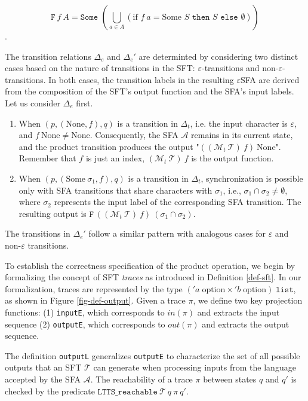 \[\texttt{F}~f~A=\texttt{Some } (\bigcup_{a\in A} (\text{if }f~a= \text{Some }S \texttt{ then } S \texttt{ else } \emptyset))\].

The transition relations $\Delta_e$ and $\Delta_e'$ are determinted by considering two distinct cases based on the nature of transitions in the SFT: $\varepsilon$-transitions and non-$\varepsilon$-transitions. In both cases, the transition labels in the resulting $\varepsilon$SFA are derived from the composition of the SFT's output function and the SFA's input labels. Let us consider $\Delta_e$ first.

\begin{enumerate}
\item When $(p, (\text{None}, f), q)$ is a transition in $\Delta_t$, i.e. the input character is $\varepsilon$, and $f~\text{None} \neq \text{None}$. Consequently, the SFA $\mathcal{A}$ remains in its current state, and the product transition produces the output "$((\mathcal{M}_t~\mathcal{T})~f)~\text{None}$". Remember that $f$ is just an index, $(\mathcal{M}_t~\mathcal{T})~f$ is the output function.

\item When $(p, (\text{Some}~\sigma_1, f), q)$ is a transition in $\Delta_t$, synchronization is possible only with SFA transitions that share characters with $\sigma_1$, i.e., $\sigma_1\cap\sigma_2\neq \emptyset$, where $\sigma_2$ represents the input label of the corresponding SFA transition. The resulting output is $\texttt{F}~((\mathcal{M}_t~\mathcal{T})~f)~(\sigma_1\cap\sigma_2)$.
\end{enumerate}

The transitions in $\Delta_e'$ follow a similar pattern with analogous cases for $\varepsilon$ and non-$\varepsilon$ transitions.

To establish the correctness specification of the product operation, we begin by formalizing the concept of SFT \emph{traces} as introduced in Definition \ref{def-sft}. In our formalization, traces are represented by the type $('a\;\text{option} \times 'b\;\text{option})\;\texttt{list}$, as shown in Figure \ref{fig-def-output}.
%
Given a trace $\pi$, we define two key projection functions:
(1) \texttt{inputE}, which corresponds to ${in}(\pi)$ and extracts the input sequence
(2) \texttt{outputE}, which corresponds to ${out}(\pi)$ and extracts the output sequence.

The definition \texttt{outputL} generalizes \texttt{outputE} to characterize the set of all possible outputs that an SFT $\mathcal{T}$ can generate when processing inputs from the language accepted by the SFA $\mathcal{A}$. The reachability of a trace $\pi$ between states $q$ and $q'$ is checked by the predicate $\texttt{LTTS\_reachable}~\mathcal{T}~q~\pi~q'$.






